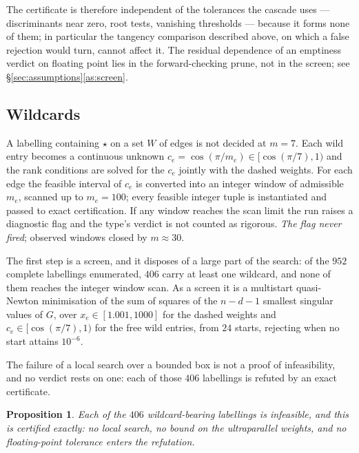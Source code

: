 \documentclass[11pt,reqno]{amsart}
\theoremstyle{plain}
\newtheorem{proposition}[theorem]{Proposition}
\theoremstyle{definition}
\newcommand{\Gr}{G}
\newcommand{\NumWild}{406}
\newcommand{\NumAssignments}{952}
\begin{document}
The certificate is therefore independent of the tolerances the cascade uses ---
discriminants near zero, root tests, vanishing thresholds --- because it forms none
of them; in particular the tangency comparison described above, on which a false
rejection would turn, cannot affect it. The residual dependence of an emptiness
verdict on floating point lies in the forward-checking prune, not in the screen;
see \S\ref{sec:assumptions}\ref{as:screen}.

\subsection{Wildcards}
\label{sec:wildcards}
A labelling containing $\star$ on a set $W$ of edges is not decided at $m=7$.
Each wild entry becomes a continuous unknown $c_e=\cos(\pi/m_e)\in[\cos(\pi/7),1)$
and the rank conditions are solved for the $c_e$ jointly with the dashed
weights. For each edge the feasible interval of $c_e$ is converted into an
integer window of admissible $m_e$, scanned up to $m_e=100$; every feasible
integer tuple is instantiated and passed to exact certification. If any window
reaches the scan limit the run raises a diagnostic flag and the type's verdict is
not counted as rigorous. \emph{The flag never fired};
observed windows closed by $m\approx30$.

The first step is a screen, and it disposes of a large part of the search: of the
$\NumAssignments$ complete labellings enumerated, $\NumWild$ carry at least one
wildcard, and none of them reaches the integer window scan. As a screen it is a
multistart quasi-Newton minimisation of the sum of squares of
the $n-d-1$ smallest singular values of $\Gr$, over $x_e\in[1.001,1000]$ for the
dashed weights and $c_e\in[\cos(\pi/7),1)$ for the free wild entries, from $24$
starts, rejecting when no start attains $10^{-6}$.

The failure of a local search over a bounded box is not a proof of infeasibility,
and no verdict rests on one: each of those $\NumWild$ labellings is refuted by an
exact certificate.

\begin{proposition}
\label{prop:wildexact}
Each of the $\NumWild$ wildcard-bearing labellings is infeasible, and this is
certified exactly: no local search, no bound on the ultraparallel weights, and no
floating-point tolerance enters the refutation.
\end{proposition}
\end{document}
